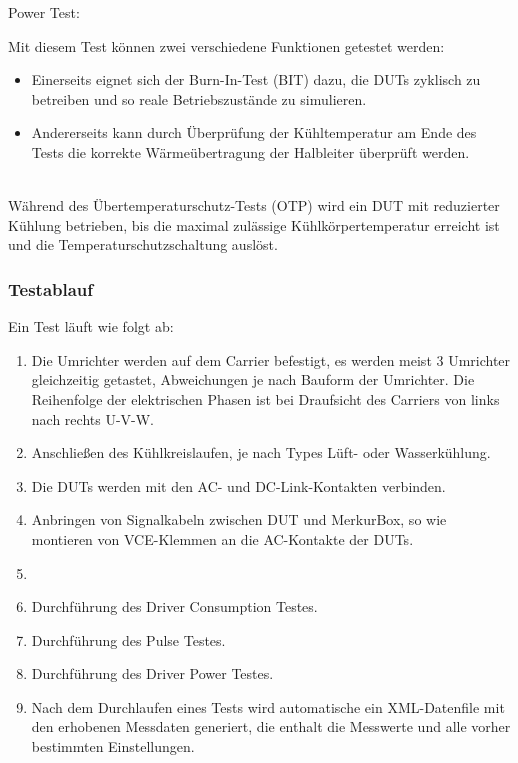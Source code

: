 Power Test:

Mit diesem Test können zwei verschiedene Funktionen getestet werden:
\begin{itemize}
    \item Einerseits eignet sich der Burn-In-Test (BIT) dazu, die DUTs zyklisch zu betreiben und so reale Betriebszustände zu simulieren.
    \item Andererseits kann durch Überprüfung der Kühltemperatur am Ende des Tests die korrekte Wärmeübertragung der Halbleiter überprüft werden.
\end{itemize}
\\
Während des Übertemperaturschutz-Tests (OTP) wird ein DUT mit reduzierter Kühlung betrieben, bis die maximal zulässige
Kühlkörpertemperatur erreicht ist und die Temperaturschutzschaltung auslöst.

\subsubsection{Testablauf}

Ein Test läuft wie folgt ab:

\begin{enumerate}
\item Die Umrichter werden auf dem Carrier befestigt, es werden meist 3 Umrichter gleichzeitig getastet, Abweichungen je nach Bauform der Umrichter.
Die Reihenfolge der elektrischen Phasen ist bei Draufsicht des Carriers von links nach rechts U-V-W.
\item Anschließen des Kühlkreislaufen, je nach Types Lüft- oder Wasserkühlung.
\item Die \ac{DUTs} werden mit den AC- und DC-Link-Kontakten verbinden.
\item Anbringen von Signalkabeln zwischen DUT und MerkurBox, so wie montieren von VCE-Klemmen an die AC-Kontakte der DUTs.
\item
\item Durchführung des Driver Consumption Testes.
\item Durchführung des Pulse Testes.
\item Durchführung des Driver Power Testes.
\item Nach dem Durchlaufen eines Tests wird automatische ein XML-Datenfile mit den erhobenen Messdaten generiert, die enthalt die Messwerte und alle vorher bestimmten Einstellungen.
\end{enumerate}


